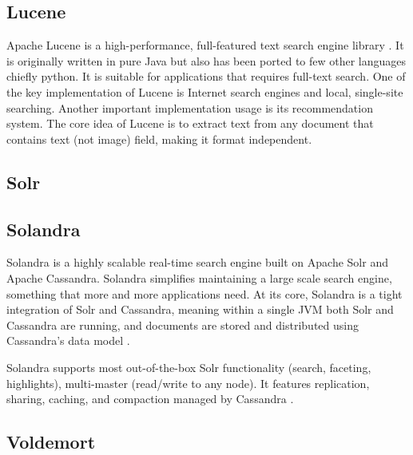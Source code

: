 {\subsection{Lucene}

     Apache Lucene is a high-performance,
     full-featured text search engine library \cite{www-lucene}.
     It is originally
     written in pure Java but also has been ported to few other
     languages chiefly python.  It is suitable for applications that
     requires full-text search.  One of the key implementation of
     Lucene is Internet search engines and local, single-site
     searching.  Another important implementation usage is its
     recommendation system. The core idea of Lucene is to extract text
     from any document that contains text (not image) field, making it
     format independent.

     \pv

\subsection{Solr}

\pv

\subsection{Solandra}
     
     Solandra is a highly scalable real-time search engine built on
     Apache Solr and Apache Cassandra. Solandra simplifies maintaining
     a large scale search engine, something that more and more
     applications need. At its core, Solandra is a tight integration
     of Solr and Cassandra, meaning within a single JVM both Solr and
     Cassandra are running, and documents are stored and distributed
     using Cassandra's data model \cite{github-solandra}.

     Solandra supports most out-of-the-box Solr functionality (search,
     faceting, highlights), multi-master (read/write to any node). It
     features replication, sharing, caching, and compaction managed
     by Cassandra \cite{github-solandra2}.

     \pv
	  
\subsection{Voldemort}

}
